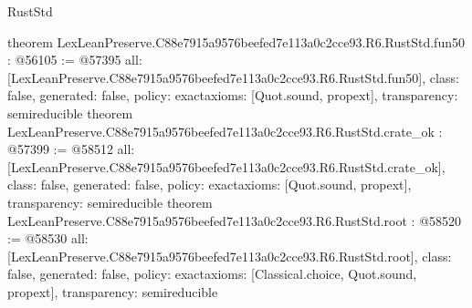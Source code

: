 \begin{lexlean}{RustStd}
\begin{coremodule}
{}
theorem LexLeanPreserve.C88e7915a9576beefed7e113a0c2cce93.R6.RustStd.fun50 : @56105 := @57395 {
  all: [LexLeanPreserve.C88e7915a9576beefed7e113a0c2cce93.R6.RustStd.fun50],
  class: false,
  generated: false,
  policy: exact{axioms: [Quot.sound, propext]},
  transparency: semireducible
}
theorem LexLeanPreserve.C88e7915a9576beefed7e113a0c2cce93.R6.RustStd.crate_ok : @57399 := @58512 {
  all: [LexLeanPreserve.C88e7915a9576beefed7e113a0c2cce93.R6.RustStd.crate_ok],
  class: false,
  generated: false,
  policy: exact{axioms: [Quot.sound, propext]},
  transparency: semireducible
}
theorem LexLeanPreserve.C88e7915a9576beefed7e113a0c2cce93.R6.RustStd.root : @58520 := @58530 {
  all: [LexLeanPreserve.C88e7915a9576beefed7e113a0c2cce93.R6.RustStd.root],
  class: false,
  generated: false,
  policy: exact{axioms: [Classical.choice, Quot.sound, propext]},
  transparency: semireducible
}


\end{coremodule}
\end{lexlean}
